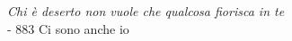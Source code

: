 \thispagestyle{plain}

{
\raggedleft
\textit{Chi è deserto non vuole che qualcosa fiorisca in te}
\\ - 883 Ci sono anche io

}